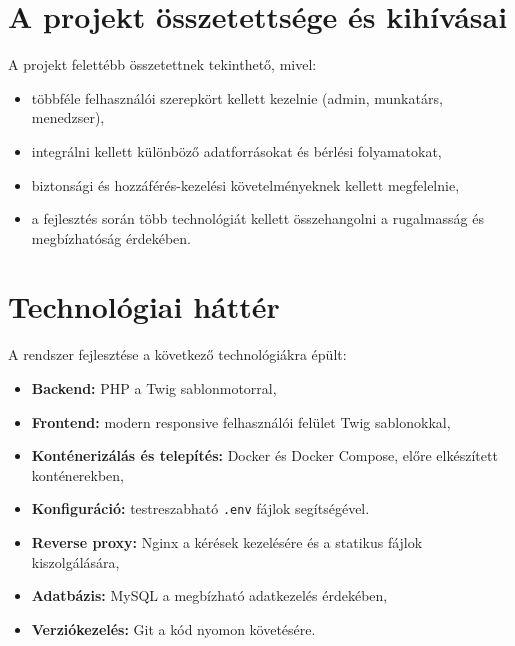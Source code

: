 \section{A projekt összetettsége és kihívásai}

A projekt felettébb összetettnek tekinthető, mivel:
\begin{itemize}
    \item többféle felhasználói szerepkört kellett kezelnie (admin, munkatárs, menedzser),
    \item integrálni kellett különböző adatforrásokat és bérlési folyamatokat,
    \item biztonsági és hozzáférés-kezelési követelményeknek kellett megfelelnie,
    \item a fejlesztés során több technológiát kellett összehangolni a rugalmasság és megbízhatóság érdekében.
\end{itemize}

\section{Technológiai háttér}

A rendszer fejlesztése a következő technológiákra épült:
\begin{itemize}
    \item \textbf{Backend:} PHP a Twig sablonmotorral,
    \item \textbf{Frontend:} modern responsive felhasználói felület Twig sablonokkal,
    \item \textbf{Konténerizálás és telepítés:} Docker és Docker Compose, előre elkészített konténerekben,
    \item \textbf{Konfiguráció:} testreszabható \texttt{.env} fájlok segítségével.
    \item \textbf{Reverse proxy:} Nginx a kérések kezelésére és a statikus fájlok kiszolgálására,
    \item \textbf{Adatbázis:} MySQL a megbízható adatkezelés érdekében,
    \item \textbf{Verziókezelés:} Git a kód nyomon követésére.
\end{itemize}

